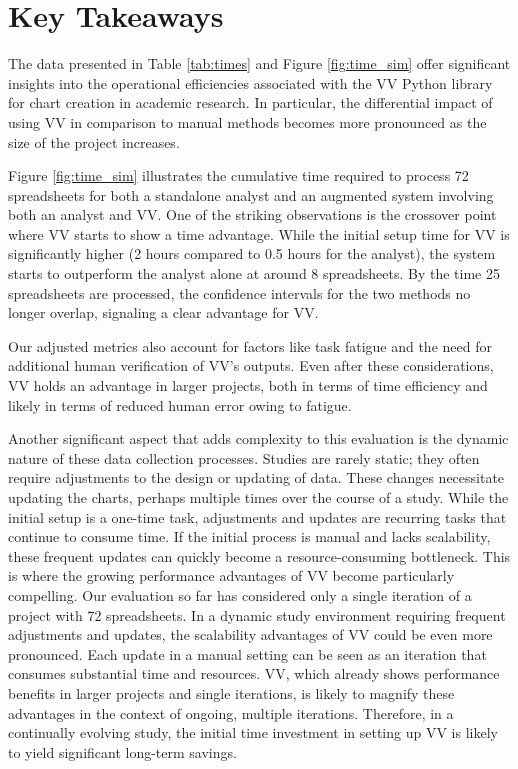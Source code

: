 \section{Key Takeaways}\label{key-takeaways}

The data presented in Table \ref{tab:times} and Figure \ref{fig:time_sim} offer significant insights
into the operational efficiencies associated with the VV Python library
for chart creation in academic research. In particular, the differential
impact of using VV in comparison to manual methods becomes more
pronounced as the size of the project increases.

Figure \ref{fig:time_sim} illustrates the cumulative time required to process 72
spreadsheets for both a standalone analyst and an augmented system
involving both an analyst and VV. One of the striking observations is
the crossover point where VV starts to show a time advantage. While the
initial setup time for VV is significantly higher (2 hours compared to
0.5 hours for the analyst), the system starts to outperform the analyst
alone at around 8 spreadsheets. By the time 25 spreadsheets are
processed, the confidence intervals for the two methods no longer
overlap, signaling a clear advantage for VV.

Our adjusted metrics also account for factors like task fatigue and the
need for additional human verification of VV's outputs. Even after these
considerations, VV holds an advantage in larger projects, both in terms
of time efficiency and likely in terms of reduced human error owing to
fatigue.

Another significant aspect that adds complexity to this evaluation is
the dynamic nature of these data collection processes. Studies are
rarely static; they often require adjustments to the design or updating
of data. These changes necessitate updating the charts, perhaps multiple
times over the course of a study. While the initial setup is a one-time
task, adjustments and updates are recurring tasks that continue to
consume time. If the initial process is manual and lacks scalability,
these frequent updates can quickly become a resource-consuming
bottleneck. This is where the growing performance advantages of VV become particularly compelling. Our evaluation so far has
considered only a single iteration of a project with 72 spreadsheets. In
a dynamic study environment requiring frequent adjustments and updates,
the scalability advantages of VV could be even more pronounced. Each
update in a manual setting can be seen as an iteration that consumes
substantial time and resources. VV, which already shows performance
benefits in larger projects and single iterations, is likely to magnify
these advantages in the context of ongoing, multiple iterations.
Therefore, in a continually evolving study, the initial time investment
in setting up VV is likely to yield significant long-term savings.
